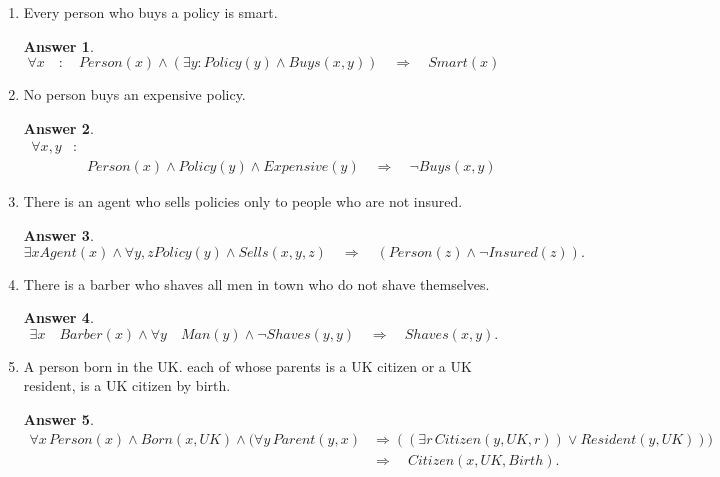 \documentclass[a4paper]{article}
\renewcommand{\(}{\left(}
\renewcommand{\)}{\right)}
\theoremstyle{plain}
\theoremstyle{plain}
\theoremstyle{definition}
\newtheorem*{answer}{Answer}
\begin{document}
\begin{enumerate}[label*=\alph*.,ref=\alph*]
\item Every person who buys a policy is smart.
\begin{shaded}
\begin{answer}
\begin{equation*}
  \forall x \quad : \quad Person(x) \wedge (\exists y : Policy(y) \wedge Buys(x,y) ) \quad \Rightarrow \quad Smart(x)
\end{equation*}
\end{answer}
\end{shaded}

\item No person buys an expensive policy.
\begin{shaded}
\begin{answer}
\begin{align*}
  \forall x, y & : \\
   & \quad Person(x) \wedge Policy(y)  \wedge Expensive(y) \quad \Rightarrow \quad  \neg Buys(x, y)
\end{align*}
\end{answer}
\end{shaded}

\item There is an agent who sells policies only to people who are not insured.
\begin{shaded}
\begin{answer}
\begin{equation*}
 \exists x Agent(x) \wedge \forall y, z Policy(y) \wedge Sells(x, y, z) \quad \Rightarrow \quad (Person(z)\wedge \neg Insured(z)).
\end{equation*}
\end{answer}
\end{shaded}

\item There is a barber who shaves all men in town who do not shave themselves.
\begin{shaded}
\begin{answer}
\begin{equation*}
  \exists x \quad Barber(x) \wedge \forall y \quad Man(y) \wedge \neg Shaves(y, y) \quad \Rightarrow \quad Shaves(x, y).
\end{equation*}
\end{answer}
\end{shaded}

\item A person born in the UK. each of whose parents is a UK citizen or a UK resident, is a UK citizen by birth.
\begin{shaded}
\begin{answer}
\begin{align*}
  \forall x \, Person(x) \wedge Born(x,UK) \wedge (\forall y \, Parent(y, x)  &\Rightarrow  ((\exists r \, Citizen(y,UK, r)) \vee Resident(y,UK))) \\
  &\Rightarrow \quad Citizen(x,UK,Birth).
\end{align*}
\end{answer}
\end{shaded}


\end{enumerate}
\end{document}
